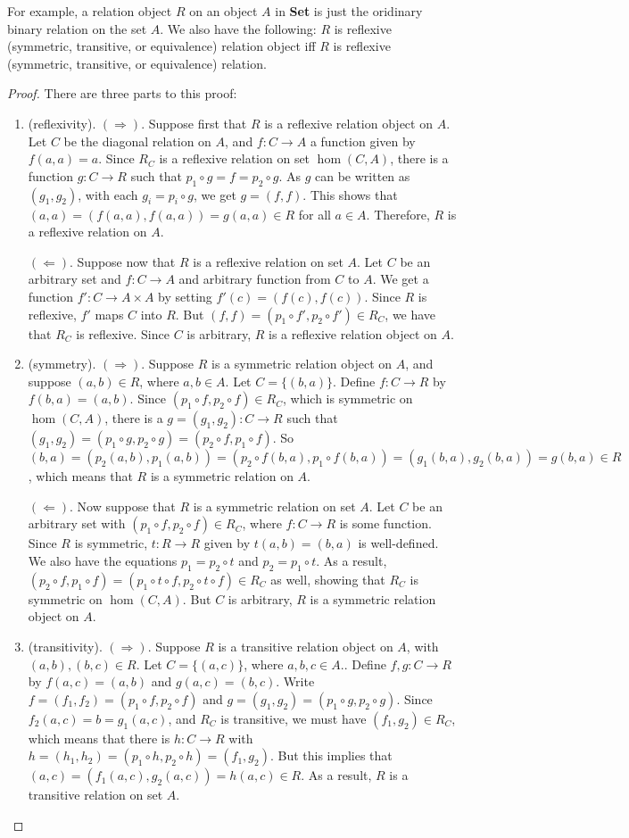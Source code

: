 \documentclass[12pt]{article}
\begin{document}
For example, a relation object $R$ on an object $A$ in \textbf{Set} is just the oridinary binary relation on the set $A$.  We also have the following: $R$ is reflexive (symmetric, transitive, or equivalence) relation object iff $R$ is reflexive (symmetric, transitive, or equivalence) relation.
\begin{proof}  There are three parts to this proof:
\begin{enumerate}
\item (reflexivity).  $(\Rightarrow)$.  Suppose first that $R$ is a reflexive relation object on $A$.  Let $C$ be the diagonal relation on $A$, and $f:C\to A$ a function given by $f(a,a)=a$.  Since $R_C$ is a reflexive relation on set $\hom(C,A)$, there is a function $g:C\to R$ such that $p_1\circ g= f = p_2 \circ g$.  As $g$ can be written as $(g_1,g_2)$, with each $g_i=p_i\circ g$, we get $g=(f,f)$.  This shows that $(a,a) = (f(a,a),f(a,a)) = g(a,a) \in R$ for all $a\in A$.  Therefore, $R$ is a reflexive relation on $A$.

$(\Leftarrow)$.  Suppose now that $R$ is a reflexive relation on set $A$.  Let $C$ be an arbitrary set and $f:C\to A$ and arbitrary function from $C$ to $A$.  We get a function $f':C\to A\times A$ by setting $f'(c)=(f(c),f(c))$.  Since $R$ is reflexive, $f'$ maps $C$ into $R$.  But $(f,f) = (p_1\circ f', p_2\circ f')\in R_C$, we have that $R_C$ is reflexive.  Since $C$ is arbitrary, $R$ is a reflexive relation object on $A$.
\item (symmetry).  $(\Rightarrow)$.  Suppose $R$ is a symmetric relation object on $A$, and suppose $(a,b)\in R$, where $a,b\in A$.  Let $C=\lbrace (b,a)\rbrace$.  Define $f:C\to R$ by $f(b,a)=(a,b)$.  Since $(p_1\circ f, p_2\circ f)\in R_C$, which is symmetric on $\hom(C,A)$, there is a $g = (g_1,g_2):C\to R$ such that $(g_1,g_2)= (p_1\circ g, p_2\circ g)=(p_2\circ f,p_1\circ f)$.  So $(b,a)=(p_2(a,b),p_1(a,b))=(p_2\circ f(b,a),p_1\circ f(b,a))=(g_1(b,a),g_2(b,a)) = g(b,a)\in R$, which means that $R$ is a symmetric relation on $A$.

$(\Leftarrow)$.  Now suppose that $R$ is a symmetric relation on set $A$.  Let $C$ be an arbitrary set with $(p_1\circ f, p_2\circ f)\in R_C$, where $f:C\to R$ is some function.  Since $R$ is symmetric, $t:R\to R$ given by $t(a,b)=(b,a)$ is well-defined.  We also have the equations $p_1=p_2\circ t$ and $p_2=p_1\circ t$.  As a result, $(p_2\circ f, p_1\circ f) = (p_1\circ t\circ f, p_2\circ t\circ f) \in R_C$ as well, showing that $R_C$ is symmetric on $\hom(C,A)$.  But $C$ is arbitrary, $R$ is a symmetric relation object on $A$.
\item (transitivity).  $(\Rightarrow)$.  Suppose $R$ is a transitive relation object on $A$, with $(a,b),(b,c)\in R$.  Let $C=\lbrace (a,c)\rbrace$, where $a,b,c\in A$..  Define $f,g:C\to R$ by $f(a,c)=(a,b)$ and $g(a,c)=(b,c)$.  Write $f=(f_1,f_2)=(p_1\circ f, p_2\circ f)$ and $g=(g_1,g_2)=(p_1\circ g,p_2\circ g)$.  Since $f_2(a,c)=b=g_1(a,c)$, and $R_C$ is transitive, we must have $(f_1,g_2)\in R_C$, which means that there is $h:C\to R$ with $h=(h_1,h_2)=(p_1\circ h, p_2\circ h) =(f_1,g_2)$.  But this implies that $(a,c)=(f_1(a,c),g_2(a,c))=h(a,c)\in R$.  As a result, $R$ is a transitive relation on set $A$.


\end{enumerate}
\end{proof}
\end{document}
